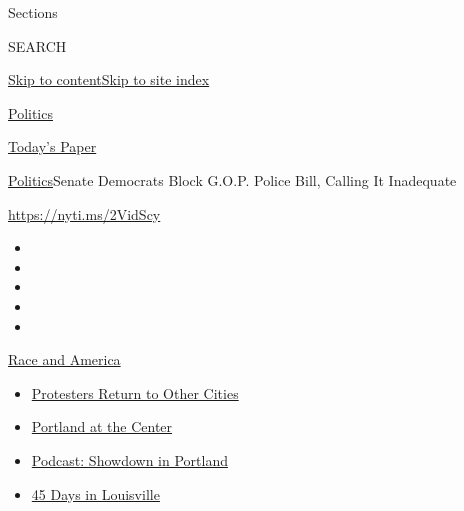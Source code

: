 Sections

SEARCH

\protect\hyperlink{site-content}{Skip to
content}\protect\hyperlink{site-index}{Skip to site index}

\href{https://www.nytimes.com/section/politics}{Politics}

\href{https://myaccount.nytimes.com/auth/login?response_type=cookie\&client_id=vi}{}

\href{https://www.nytimes.com/section/todayspaper}{Today's Paper}

\href{/section/politics}{Politics}\textbar{}Senate Democrats Block
G.O.P. Police Bill, Calling It Inadequate

\url{https://nyti.ms/2VidScy}

\begin{itemize}
\item
\item
\item
\item
\item
\end{itemize}

\href{https://www.nytimes.com/news-event/george-floyd-protests-minneapolis-new-york-los-angeles?action=click\&pgtype=Article\&state=default\&region=TOP_BANNER\&context=storylines_menu}{Race
and America}

\begin{itemize}
\tightlist
\item
  \href{https://www.nytimes.com/2020/07/26/us/protests-portland-seattle-trump.html?action=click\&pgtype=Article\&state=default\&region=TOP_BANNER\&context=storylines_menu}{Protesters
  Return to Other Cities}
\item
  \href{https://www.nytimes.com/2020/07/24/us/portland-oregon-protests-white-race.html?action=click\&pgtype=Article\&state=default\&region=TOP_BANNER\&context=storylines_menu}{Portland
  at the Center}
\item
  \href{https://www.nytimes.com/2020/07/23/podcasts/the-daily/portland-protests.html?action=click\&pgtype=Article\&state=default\&region=TOP_BANNER\&context=storylines_menu}{Podcast:
  Showdown in Portland}
\item
  \href{https://www.nytimes.com/interactive/2020/07/16/us/black-lives-matter-protests-louisville-breonna-taylor.html?action=click\&pgtype=Article\&state=default\&region=TOP_BANNER\&context=storylines_menu}{45
  Days in Louisville}
\end{itemize}

